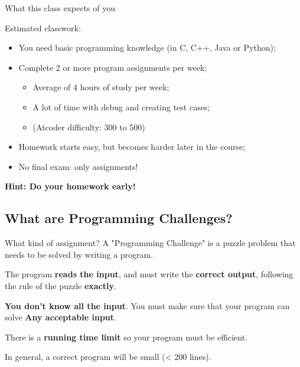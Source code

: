 \begin{frame}{What this class expects of you}
  \begin{exampleblock}{Estimated classwork:}
    \begin{itemize}
      \item You need basic programming knowledge (in C, C++, Java or Python);
      \medskip

      \item Complete 2 or more program assignments per week;
      \begin{itemize}
        \item Average of 4 hours of study per week;
        \item A lot of time with debug and creating test cases;
        \item (Atcoder difficulty: 300 to 500)
      \end{itemize}
      \medskip

      \item Homework starts easy, but becomes harder later in the course;
      \medskip

      \item No final exam: only assignments!
    \end{itemize}
  \end{exampleblock}
  \hfill {\bf Hint: Do your homework early!}
\end{frame}

\subsection{What are Programming Challenges?}
\begin{frame}{What kind of assignment?}
  A "Programming Challenge" is a puzzle problem that needs to be solved by writing
  a program.\vfill

  The program {\bf reads the input}, and must write the {\bf correct output},
  following the rule of the puzzle {\bf exactly}.\vfill

  {\bf You don't know all the input}. You must make sure that your program
  can solve {\bf Any acceptable input}.\vfill

  There is a {\bf running time limit} so your program must be efficient.\vfill

  In general, a correct program will be small (< 200 lines).
\end{frame}


